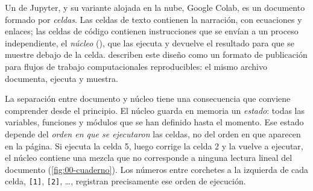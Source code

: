Un  de Jupyter, y su variante alojada en la nube, Google Colab, es un documento formado por \emph{celdas}. Las celdas de texto contienen la narración, con ecuaciones y enlaces; las celdas de código contienen instrucciones que se envían a un proceso independiente, el \emph{núcleo} (), que las ejecuta y devuelve el resultado para que se muestre debajo de la celda. \textcite{c00-kluyver2016} describen este diseño como un formato de publicación para flujos de trabajo computacionales reproducibles: el mismo archivo documenta, ejecuta y muestra.

La separación entre documento y núcleo tiene una consecuencia que conviene comprender desde el principio. El núcleo guarda en memoria un \emph{estado}: todas las variables, funciones y módulos que se han definido hasta el momento. Ese estado depende del \emph{orden en que se ejecutaron} las celdas, no del orden en que aparecen en la página. Si ejecuta la celda 5, luego corrige la celda 2 y la vuelve a ejecutar, el núcleo contiene una mezcla que no corresponde a ninguna lectura lineal del documento (\cref{fig:00-cuaderno}). Los números entre corchetes a la izquierda de cada celda, \texttt{[1]}, \texttt{[2]}, \ldots, registran precisamente ese orden de ejecución.

